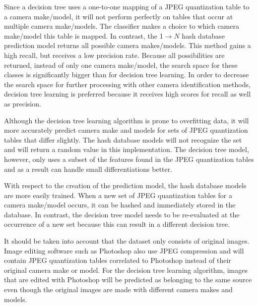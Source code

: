 Since a decision tree uses a one-to-one mapping of a JPEG quantization table to a camera make/model, it will not perform perfectly on tables that occur at multiple camera make/models. The classifier makes a choice to which camera make/model this table is mapped. In contrast, the 
1$\rightarrow N$ hash database prediction model returns all possible camera makes/models. This method gains a high recall, but receives a low precision rate. Because all possibilities are returned, instead of only one camera make/model, the search space for these classes is significantly bigger than for decision tree learning. In order to decrease the search space for further processing with other camera identification methods, decision tree learning is preferred because it receives high scores for recall as well as precision.

Although the decision tree learning algorithm is prone to overfitting data, it will more accurately predict camera make and models for sets of JPEG quantization tables that differ slightly. The hash database models will not recognize the set and will return a random value in this implementation. The decision tree model, however, only uses a subset of the features found in the JPEG quantization tables and as a result can handle small differentiations better.

With respect to the creation of the prediction model, the hash database models are more easily trained. When a new set of JPEG quantization tables for a camera make/model occurs, it can be hashed and immediately stored in the database. In contrast, the decision tree model needs to be re-evaluated at the occurrence of a new set because this can result in a different decision tree.

It should be taken into account that the dataset only consists of original images. Image editing software such as Photoshop also use JPEG compression and will contain JPEG quantization tables correlated to Photoshop instead of their original camera make or model. For the decision tree learning algorithm, images that are edited with Photoshop will be predicted as belonging to the same source even though the original images are made with different camera makes and models. 

